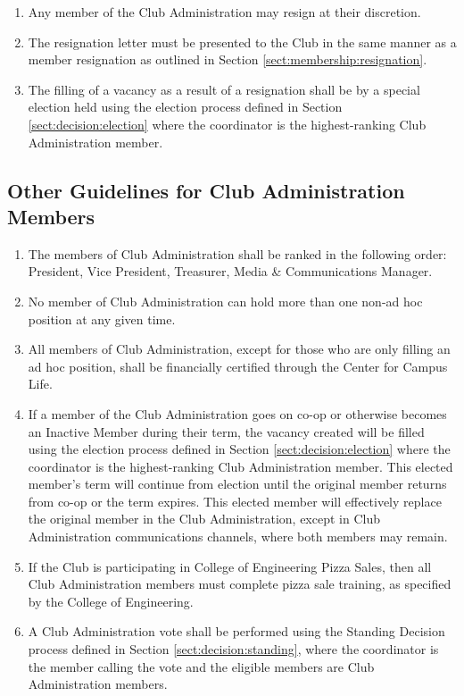 \documentclass[english,11pt]{article}
\begin{document}
\begin{enumerate}[label=\alph*.]
    \item Any member of the Club Administration may resign at their discretion.
    \item The resignation letter must be presented to the Club in the same manner as a member resignation as outlined in Section \ref{sect:membership:resignation}.
    \item The filling of a vacancy as a result of a resignation shall be by a special election held using the election process defined in Section \ref{sect:decision:election} where the coordinator is the highest-ranking Club Administration member.
\end{enumerate}

\subsection{Other Guidelines for Club Administration Members} \label{subsect:cadmin:other}

\begin{enumerate}[label=\Alph*.]
    \item The members of Club Administration shall be ranked in the following order: President, Vice President, Treasurer, Media \& Communications Manager.
    \item No member of Club Administration can hold more than one non-ad hoc position at any given time.
    \item All members of Club Administration, except for those who are only filling an ad hoc position, shall be financially certified through the Center for Campus Life.
    \item If a member of the Club Administration goes on co-op or otherwise becomes an Inactive Member during their term, the vacancy created will be filled using the election process defined in Section \ref{sect:decision:election} where the coordinator is the highest-ranking Club Administration member.
          This elected member's term will continue from election until the original member returns from co-op or the term expires.
          This elected member will effectively replace the original member in the Club Administration, except in Club Administration communications channels, where both members may remain.
    \item If the Club is participating in College of Engineering Pizza Sales, then all Club Administration members must complete pizza sale training, as specified by the College of Engineering.
    \item A Club Administration vote shall be performed using the Standing Decision process defined in Section \ref{sect:decision:standing}, where the coordinator is the member calling the vote and the eligible members are Club Administration members.
\end{enumerate}
\end{document}
